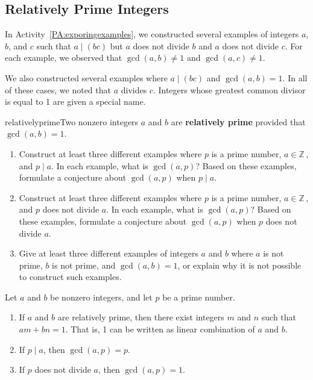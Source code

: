 \subsection*{Relatively Prime Integers}
In \typeu Activity~\ref*{PA:exporingexamples}, we constructed several examples of integers  $a$, $b$, and  $c$  such that  $a \mid \left( {bc} \right)$ but  $a$  does not divide  $b$  and  $a$  does not divide  $c$.  For each example, we observed that  $\gcd( {a, b} ) \ne 1$
  and  $\gcd( {a, c} ) \ne 1$.  

We also constructed several examples where  $a \mid \left( {bc} \right)$ and  
$\gcd( {a, b} ) = 1$.  In all of these cases, we noted that  $a$  divides  $c$.  Integers whose greatest common divisor is equal to 1 are given a special name.

\begin{defbox}{relativelyprime}{Two nonzero integers  $a$  and  $b$  are \textbf{relatively prime}
%
 provided that  $\gcd( {a, b} ) = 1$.}
\end{defbox}
%
\begin{prog} \label{prog:relativelyprime} \hfill
\begin{enumerate}
\item Construct at least three different examples where  $p$  is a prime number, $a \in \mathbb{Z}$\,, and  $p \mid a$.  In each example, what is  $\gcd( {a, p} )$?  Based on these examples, formulate a conjecture about $\gcd( {a, p} )$ when $p \mid a$.

\item Construct at least three different examples where  $p$  is a prime number, $a \in \mathbb{Z}$\,, and  $p$  does not divide  $a$.  In each example, what is  
$\gcd( {a, p} )$?  Based on these examples, formulate a conjecture about $\gcd( {a, p} )$ when 
$p$ does not divide $a$.

\item Give at least three different examples of integers  $a$  and  $b$  where  $a$  is not prime,  $b$  is not prime, and  $\gcd( {a, b} ) = 1$, or explain why it is not possible to construct such examples.
\end{enumerate}
\end{prog}
\hbreak
%
\begin{theorem} \label{T:relativelyprime}
Let  $a$  and  $b$  be nonzero integers, and let  $p$  be a  prime number.
\begin{enumerate}
\item If  $a$  and  $b$  are relatively prime, then there exist integers  $m$  and  $n$  such that  $am + bn = 1$.  That is,  1  can be written as linear combination of  $a$  and  $b$. \label{T:relativelyprime1}

\item If  $p \mid a$, then  $\gcd( {a, p} ) = p$. \label{P:relativelyprime2}

\item If  $p$  does not divide  $a$, then  $\gcd( {a, p} ) = 1$. \label{T:relativelyprime3}
\end{enumerate}
\end{theorem}

